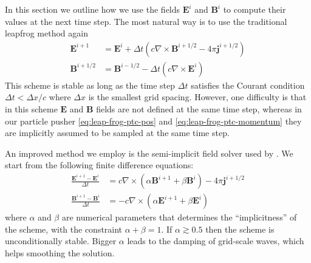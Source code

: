 In this section we outline how we use the fields $\mathbf{E}^{i}$ and
$\mathbf{B}^{i}$ to compute their values at the next time step. The most
natural way is to use the traditional leapfrog method again
\begin{align}
  \label{eq:maxwell-leapfrog}
  \mathbf{E}^{i+1} &= \mathbf{E}^i + \Delta t (c\nabla\times \mathbf{B}^{i+1/2} - 4\pi \mathbf{j}^{i+1/2}) \\
  \mathbf{B}^{i+1/2} &= \mathbf{B}^{i-1/2} - \Delta t (c\nabla\times \mathbf{E}^i)
\end{align}
This scheme is stable as long as the time step $\Delta t$ satisfies the Courant
condition $\Delta t < \Delta x / c$ where $\Delta x$ is the smallest grid
spacing. However, one difficulty is that in this scheme $\mathbf{E}$ and
$\mathbf{B}$ fields are not defined at the same time step, whereas in our
particle pusher \eqref{eq:leap-frog-ptc-pos} and
\eqref{eq:leap-frog-ptc-momentum} they are implicitly assumed to be sampled at
the same time step.

An improved method we employ is the semi-implicit field solver used by
\citet{haugboelle_photon-plasma:_2012}. We start from the following finite
difference equations:
\begin{align}
  \frac{\mathbf{E}^{i+1} -\mathbf{E}^{i}}{\Delta t} & = c\nabla \times (
  \alpha \mathbf{B}^{i+1} + \beta \mathbf{B}^{i} ) - 4\pi\mathbf{j}^{i+1/2}\\
  \frac{\mathbf{B}^{i+1} -\mathbf{B}^{i}}{\Delta t} & = - c\nabla \times
  ( \alpha \mathbf{E}^{i+1} + \beta \mathbf{E}^{i} )
\end{align}
where $\alpha$ and $\beta$ are numerical parameters that determines
the ``implicitness'' of the scheme, with the constraint $\alpha +
\beta = 1$. If $\alpha \gtrsim 0.5$ then the scheme is unconditionally
stable. Bigger $\alpha$ leads to the damping of grid-scale waves,
which helps smoothing the solution.

